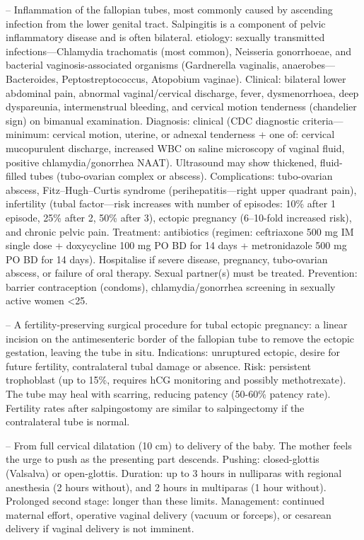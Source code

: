 -- Inflammation of the fallopian tubes, most commonly caused by ascending infection from the lower genital tract. Salpingitis is a component of pelvic inflammatory disease and is often bilateral. etiology: sexually transmitted infections—Chlamydia trachomatis (most common), Neisseria gonorrhoeae, and bacterial vaginosis-associated organisms (Gardnerella vaginalis, anaerobes—Bacteroides, Peptostreptococcus, Atopobium vaginae). Clinical: bilateral lower abdominal pain, abnormal vaginal/cervical discharge, fever, dysmenorrhoea, deep dyspareunia, intermenstrual bleeding, and cervical motion tenderness (chandelier sign) on bimanual examination. Diagnosis: clinical (CDC diagnostic criteria—minimum: cervical motion, uterine, or adnexal tenderness + one of: cervical mucopurulent discharge, increased WBC on saline microscopy of vaginal fluid, positive chlamydia/gonorrhea NAAT). Ultrasound may show thickened, fluid-filled tubes (tubo-ovarian complex or abscess). Complications: tubo-ovarian abscess, Fitz–Hugh–Curtis syndrome (perihepatitis—right upper quadrant pain), infertility (tubal factor—risk increases with number of episodes: 10\% after 1 episode, 25\% after 2, 50\% after 3), ectopic pregnancy (6--10-fold increased risk), and chronic pelvic pain. Treatment: antibiotics (regimen: ceftriaxone 500 mg IM single dose + doxycycline 100 mg PO BD for 14 days + metronidazole 500 mg PO BD for 14 days). Hospitalise if severe disease, pregnancy, tubo-ovarian abscess, or failure of oral therapy. Sexual partner(s) must be treated. Prevention: barrier contraception (condoms), chlamydia/gonorrhea screening in sexually active women <25.

-- A fertility-preserving surgical procedure for tubal ectopic pregnancy: a linear incision on the antimesenteric border of the fallopian tube to remove the ectopic gestation, leaving the tube in situ. Indications: unruptured ectopic, desire for future fertility, contralateral tubal damage or absence. Risk: persistent trophoblast (up to 15\%, requires hCG monitoring and possibly methotrexate). The tube may heal with scarring, reducing patency (50-60\% patency rate). Fertility rates after salpingostomy are similar to salpingectomy if the contralateral tube is normal.

-- From full cervical dilatation (10 cm) to delivery of the baby. The mother feels the urge to push as the presenting part descends. Pushing: closed-glottis (Valsalva) or open-glottis. Duration: up to 3 hours in nulliparas with regional anesthesia (2 hours without), and 2 hours in multiparas (1 hour without). Prolonged second stage: longer than these limits. Management: continued maternal effort, operative vaginal delivery (vacuum or forceps), or cesarean delivery if vaginal delivery is not imminent.


